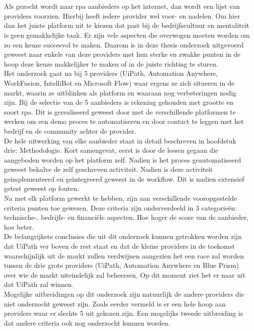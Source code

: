 \chapter*{}
Als gezocht wordt naar \acrshort{rpa} aanbieders op het internet, dan wordt een lijst van providers voorzien. Hierbij heeft iedere provider wel voor- en nadelen. Om hier dan het juiste platform uit te kiezen dat past bij de bedrijfscultuur en mentaliteit is geen gemakkelijke taak. Er zijn vele aspecten die overwogen moeten worden om zo een keuze succesvol te maken. Daarom is in deze thesis onderzoek uitgevoerd geweest naar enkele van deze providers met hun sterke en zwakke punten in de hoop deze keuze makkelijker te maken of in de juiste richting te sturen.\\
Het onderzoek gaat na bij 5 providers (UiPath, Automation Anywhere, WorkFusion, IntelliBot en Microsoft Flow) waar ergens ze zich situeren in de markt, waarin ze uitblinken als platform en waaraan nog verbeteringen nodig zijn. Bij de selectie van de 5 aanbieders is rekening gehouden met grootte en soort \acrshort{rpa}. Dit is gerealiseerd geweest door met de verschillende platformen te werken om een demo proces te automatiseren en door contact te leggen met het bedrijf en de community achter de provider.\\
De hele uitwerking van elke aanbieder staat in detail beschreven in hoofdstuk drie: Methodologie. Kort samengevat, eerst is door de lessen gegaan die aangeboden worden op het platform zelf. Nadien is het proces geautomatiseerd geweest behalve de zelf geschreven activiteit. Nadien is deze activiteit geïmplementeerd en geïntegreerd geweest in de workflow. Dit is nadien extensief getest geweest op fouten.\\
Na met elk platform gewerkt te hebben, zijn aan verschillende vooropgestelde criteria punten toe gewezen. Deze criteria zijn onderverdeeld in 3 categorieën: technische-, bedrijfs- en financiële aspecten. Hoe hoger de score van de aanbieder, hoe beter.\\
De belangrijkste conclusies die uit dit onderzoek kunnen getrokken worden zijn dat UiPath ver boven de rest staat en dat de kleine providers in de toekomst waarschijnlijk uit de markt zullen verdwijnen aangezien het een race zal worden tussen de drie grote providers (UiPath, Automation Anywhere en Blue Prism) over wie de markt uiteindelijk zal beheersen. Op dit moment ziet het er naar uit dat UiPath zal winnen.\\
Mogelijke uitbreidingen op dit onderzoek zijn natuurlijk de andere providers die niet onderzocht geweest zijn. Zoals eerder vermeld is er een hele hoop aan providers waar er slechts 5 uit gekozen zijn. Een mogelijks tweede uitbreiding is dat andere criteria ook nog onderzocht kunnen worden.